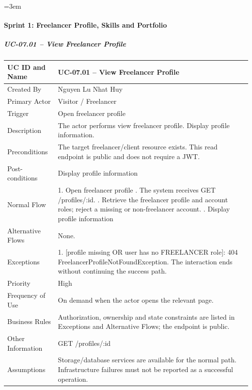 \begingroup\sloppy\emergencystretch=3em\relax
\paragraph{Sprint 1: Freelancer Profile, Skills and Portfolio}

\subparagraph{UC-07.01 -- View Freelancer Profile}
{\singlespacing\small
\begin{longtable}{|L{3.2cm}|L{11.1cm}|}\hline
UC ID and Name & UC-07.01 -- View Freelancer Profile \\ \hline
Created By & Nguyen Lu Nhat Huy \\ \hline
Primary Actor & Visitor /\allowbreak{} Freelancer \\ \hline
Trigger & Open freelancer profile \\ \hline
Description & The actor performs view freelancer profile. Display profile information. \\ \hline
Preconditions & The target freelancer/\allowbreak{}client resource exists. This read endpoint is public and does not require a JWT. \\ \hline
Post-conditions & Display profile information \\ \hline
Normal Flow & 1. Open freelancer profile . The system receives GET /\allowbreak{}profiles/\allowbreak{}:id. . Retrieve the freelancer profile and account roles; reject a missing or non-freelancer account. . Display profile information \\ \hline
Alternative Flows & None. \\ \hline
Exceptions & 1. [profile missing OR user has no FREELANCER role]: 404 Freelancer\allowbreak{}Profile\allowbreak{}Not\allowbreak{}Found\allowbreak{}Exception. The interaction ends without continuing the success path. \\ \hline
Priority & High \\ \hline
Frequency of Use & On demand when the actor opens the relevant page. \\ \hline
Business Rules & Authorization, ownership and state constraints are listed in Exceptions and Alternative Flows; the endpoint is public. \\ \hline
Other Information & GET /\allowbreak{}profiles/\allowbreak{}:id \\ \hline
Assumptions & Storage/\allowbreak{}database services are available for the normal path. Infrastructure failures must not be reported as a successful operation. \\ \hline
\end{longtable}}

